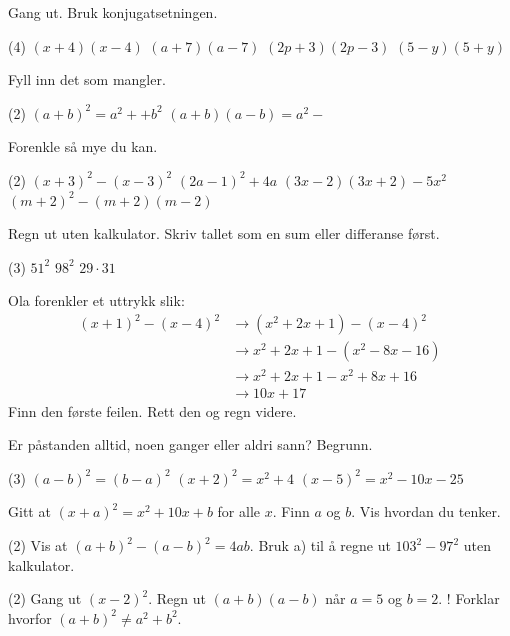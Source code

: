 Gang ut. Bruk konjugatsetningen.
\begin{tasks}(4)
  \task $(x+4)(x-4)$
  \task $(a+7)(a-7)$
  \task $(2p+3)(2p-3)$
  \task $(5-y)(5+y)$
\end{tasks}

Fyll inn det som mangler.
\begin{tasks}(2)
  \task $(a+b)^2 = a^2 + $\skrivlinje[2cm]$ + b^2$
  \task $(a+b)(a-b) = a^2 - $\skrivlinje[2cm]
\end{tasks}


Forenkle så mye du kan.
\begin{tasks}(2)
  \task $(x+3)^2 - (x-3)^2$
  \task $(2a-1)^2 + 4a$
  \task $(3x-2)(3x+2) - 5x^2$
  \task $(m+2)^2 - (m+2)(m-2)$
\end{tasks}

Regn ut uten kalkulator. Skriv tallet som en sum eller differanse først.
\begin{tasks}(3)
  \task $51^2$
  \task $98^2$
  \task $29 \cdot 31$
\end{tasks}

Ola forenkler et uttrykk slik:
\begin{align*}
(x+1)^2 - (x-4)^2 &\to (x^2 + 2x + 1) - (x-4)^2\\
&\to x^2 + 2x + 1 - (x^2 - 8x - 16)\\
&\to x^2 + 2x + 1 - x^2 + 8x + 16\\
&\to 10x + 17
\end{align*}
Finn den første feilen. Rett den og regn videre.


Er påstanden alltid, noen ganger eller aldri sann? Begrunn.
\begin{tasks}(3)
  \task $(a-b)^2 = (b-a)^2$
  \task $(x+2)^2 = x^2 + 4$
  \task $(x-5)^2 = x^2 - 10x - 25$
\end{tasks}

Gitt at $(x+a)^2 = x^2 + 10x + b$ for alle $x$. Finn $a$ og $b$. Vis hvordan du tenker.

\begin{tasks}(2)
  \task Vis at $(a+b)^2 - (a-b)^2 = 4ab$.
  \task Bruk a) til å regne ut $103^2 - 97^2$ uten kalkulator.
\end{tasks}

\begin{sjekk}
\begin{tasks}(2)
  \task Gang ut $(x-2)^2$.
  \task Regn ut $(a+b)(a-b)$ når $a = 5$ og $b = 2$.
  \task! Forklar hvorfor $(a+b)^2 \neq a^2 + b^2$.
\end{tasks}
\end{sjekk}

